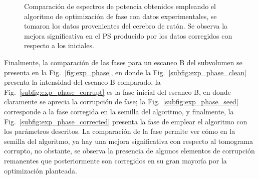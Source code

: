 \begin{figure}[ht!]
	\centering
	\caption[Espectros de potencia con datos experimentales]{Comparación de espectros de potencia obtenidos empleando el algoritmo de optimización de fase con datos experimentales, se tomaron los datos provenientes del cerebro de ratón. Se observa la mejora significativa en el PS producido por los datos corregidos con respecto a los iniciales.}
	\label{fig:exp_ps}
\end{figure}

Finalmente, la comparación de las fases para un escaneo B del subvolumen se presenta en la Fig.~\ref{fig:exp_phase}, en donde la Fig.~\ref{subfig:exp_phase_clean} presenta la intensidad del escaneo B comparado, la Fig.~\ref{subfig:exp_phase_corrupt} es la fase inicial del escaneo B, en donde claramente se aprecia la corrupción de fase; la Fig.~\ref{subfig:exp_phase_seed} corresponde a la fase corregida en la semilla del algoritmo, y finalmente, la Fig.~\ref{subfig:exp_phase_corrected} presenta la fase de emplear el algoritmo con los parámetros descritos. La comparación de la fase permite ver cómo en la semilla del algoritmo, ya hay una mejora significativa con respecto al tomograma corrupto, no obstante, se observa la presencia de algunos elementos de corrupción remanentes que posteriormente son corregidos en su gran mayoría por la optimización planteada. 

